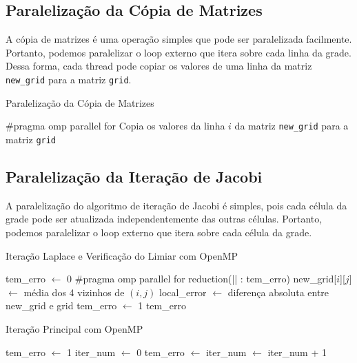 \documentclass[conference]{IEEEtran}
\begin{document}
\subsection{Paralelização da Cópia de Matrizes}

A cópia de matrizes é uma operação simples que pode ser paralelizada facilmente. Portanto, podemos paralelizar o loop externo que itera sobre cada linha da grade. Dessa forma, cada thread pode copiar os valores de uma linha da matriz \texttt{new\_grid} para a matriz \texttt{grid}.

\begin{algorithm}[H]
    \caption{Paralelização da Cópia de Matrizes}
    \begin{algorithmic}[1]
        \State \#pragma omp parallel for
        \State Copia os valores da linha $i$ da matriz \texttt{new\_grid} para a matriz \texttt{grid}
        \EndFor
        \EndFunction
    \end{algorithmic}
\end{algorithm}


\subsection{Paralelização da Iteração de Jacobi}

A paralelização do algoritmo de iteração de Jacobi é simples, pois cada célula da grade pode ser atualizada independentemente das outras células. Portanto, podemos paralelizar o loop externo que itera sobre cada célula da grade.

\begin{algorithm}[H]
    \caption{Iteração Laplace e Verificação do Limiar com OpenMP}
    \begin{algorithmic}[1]
        \State tem\_erro $\gets$ 0
        \State \#pragma omp parallel for reduction(|| : tem\_erro)
        \State new\_grid[$i$][$j$] $\gets$ média dos 4 vizinhos de $(i, j)$
        \State local\_error $\gets$ diferença absoluta entre new\_grid e grid
        \State tem\_erro $\gets$ 1
        \EndIf
        \EndFor
        \State \Return tem\_erro
        \EndFunction
    \end{algorithmic}
\end{algorithm}

\begin{algorithm}[H]
    \caption{Iteração Principal com OpenMP}
    \begin{algorithmic}[1]
        \State tem\_erro $\gets$ 1
        \State iter\_num $\gets$ 0
        \State tem\_erro $\gets$ 
        \State {}
        \State iter\_num $\gets$ iter\_num + 1
        \EndWhile
        \EndFunction
    \end{algorithmic}
\end{algorithm}
\end{document}
